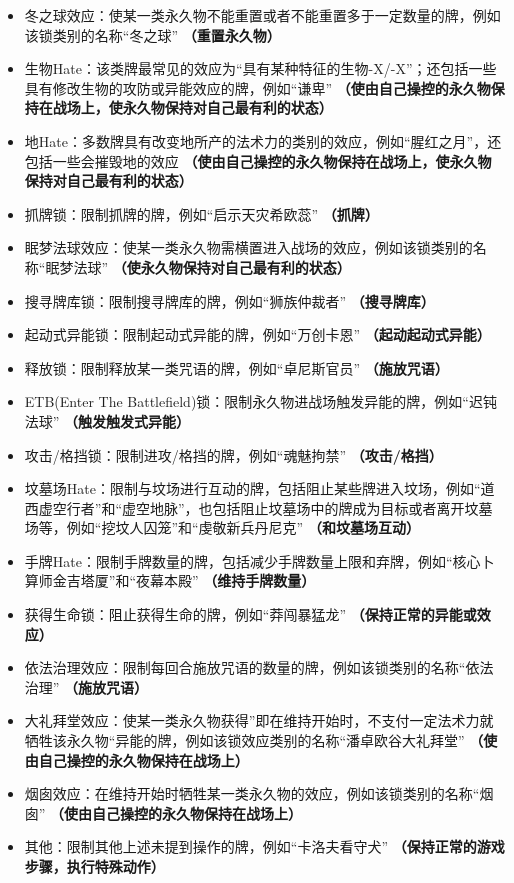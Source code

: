 \documentclass[lang = cn, color = black, 10pt]{AllThatStax}
\begin{document}
\begin{itemize}
	\item 冬之球效应：使某一类永久物不能重置或者不能重置多于一定数量的牌，例如该锁类别的名称“冬之球” \hfill \textbf{（重置永久物）}
    \item 生物Hate：该类牌最常见的效应为“具有某种特征的生物-X/-X”；还包括一些具有修改生物的攻防或异能效应的牌，例如“谦卑” \hfill \textbf{（使由自己操控的永久物保持在战场上，使永久物保持对自己最有利的状态）}
	\item 地Hate：多数牌具有改变地所产的法术力的类别的效应，例如“腥红之月”，还包括一些会摧毁地的效应 \hfill \textbf{（使由自己操控的永久物保持在战场上，使永久物保持对自己最有利的状态）}
	\item 抓牌锁：限制抓牌的牌，例如“启示天灾希欧蕊” \hfill \textbf{（抓牌）}
	\item 眠梦法球效应：使某一类永久物需横置进入战场的效应，例如该锁类别的名称“眠梦法球” \hfill \textbf{（使永久物保持对自己最有利的状态）}
	\item 搜寻牌库锁：限制搜寻牌库的牌，例如“狮族仲裁者” \hfill \textbf{（搜寻牌库）}
	\item 起动式异能锁：限制起动式异能的牌，例如“万创卡恩” \hfill \textbf{（起动起动式异能）}
	\item 释放锁：限制释放某一类咒语的牌，例如“卓尼斯官员” \hfill \textbf{（施放咒语）}
	\item ETB(Enter The Battlefield)锁：限制永久物进战场触发异能的牌，例如“迟钝法球” \hfill \textbf{（触发触发式异能）}
	\item 攻击/格挡锁：限制进攻/格挡的牌，例如“魂魅拘禁” \hfill \textbf{（攻击/格挡）}
	\item 坟墓场Hate：限制与坟场进行互动的牌，包括阻止某些牌进入坟场，例如“道西虚空行者”和“虚空地脉”，也包括阻止坟墓场中的牌成为目标或者离开坟墓场等，例如“挖坟人囚笼”和“虔敬新兵丹尼克” \hfill \textbf{（和坟墓场互动）}
	\item 手牌Hate：限制手牌数量的牌，包括减少手牌数量上限和弃牌，例如“核心卜算师金吉塔厦”和“夜幕本殿” \hfill \textbf{（维持手牌数量）}
	\item 获得生命锁：阻止获得生命的牌，例如“莽闯暴猛龙” \hfill \textbf{（保持正常的异能或效应）}
	\item 依法治理效应：限制每回合施放咒语的数量的牌，例如该锁类别的名称“依法治理” \hfill \textbf{（施放咒语）}
	\item 大礼拜堂效应：使某一类永久物获得”即在维持开始时，不支付一定法术力就牺牲该永久物“异能的牌，例如该锁效应类别的名称“潘卓欧谷大礼拜堂” \hfill \textbf{（使由自己操控的永久物保持在战场上）}
	\item 烟囱效应：在维持开始时牺牲某一类永久物的效应，例如该锁类别的名称“烟囱” \hfill \textbf{（使由自己操控的永久物保持在战场上）}
	\item 其他：限制其他上述未提到操作的牌，例如“卡洛夫看守犬” \hfill \textbf{（保持正常的游戏步骤，执行特殊动作）}
\end{itemize}
\end{document}
